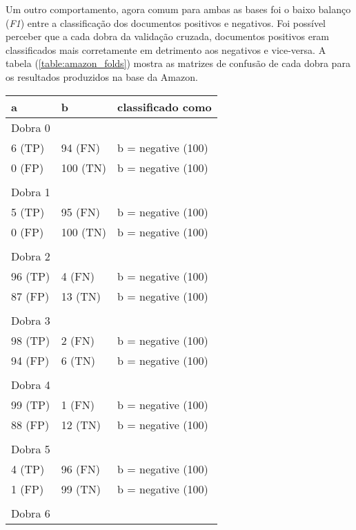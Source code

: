 Um outro comportamento, agora comum para ambas as bases foi o baixo balanço (\textit{F1}) entre a classificação dos documentos positivos e negativos. Foi possível perceber que a cada dobra da validação cruzada, documentos positivos eram classificados mais corretamente em detrimento aos negativos e vice-versa.
A tabela (\ref{table:amazon_folds}) mostra as matrizes de confusão de cada dobra para os resultados produzidos na base da Amazon. 

\begin{table}[!h]
    \begin{tabular}{lll}
    a         					& b                          		& classificado como                                  \\ \hline
	Dobra 0 \\    
    6 (TP)    				&94 (FN)      				& b = negative (100) \\
    0 (FP)    				&100 (TN)      				& b = negative (100) \\
	&&\\
	Dobra 1    \\
    5 (TP)    				&95 (FN)      				& b = negative (100) \\
    0 (FP)    				&100 (TN)      				& b = negative (100) \\
	&&\\ 
	Dobra 2    \\
    96 (TP)    				&4 (FN)      				& b = negative (100) \\
    87 (FP)    				&13 (TN)      				& b = negative (100) \\
	&&\\
    Dobra 3    \\
    98 (TP)    				&2 (FN)      				& b = negative (100) \\
    94 (FP)    				&6 (TN)      				& b = negative (100) \\
	&&\\
	Dobra 4    \\
    99 (TP)    				&1 (FN)      				& b = negative (100) \\
    88 (FP)    				&12 (TN)      				& b = negative (100) \\
	&&\\
	Dobra 5    \\
    4 (TP)    				&96 (FN)      				& b = negative (100) \\
    1 (FP)    				&99 (TN)      				& b = negative (100) \\
	&&\\
	Dobra 6    \\

\end{tabular}
\end{table}
